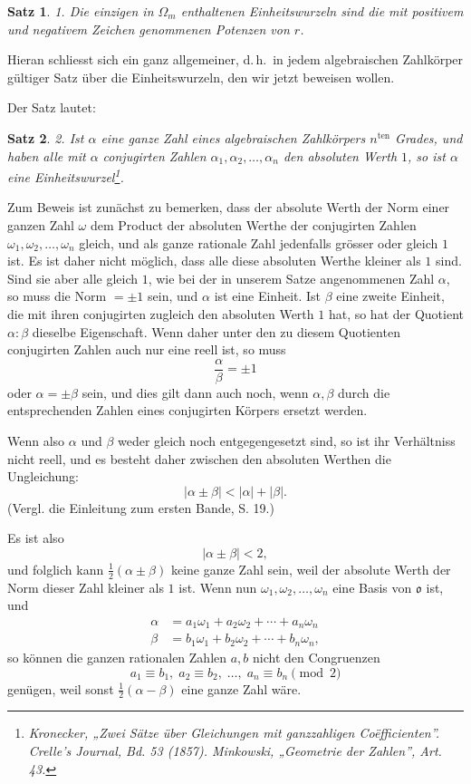 \documentclass[12pt,a4paper]{article}
\newtheorem*{satz}{Satz}
\begin{document}
\begin{satz}
1. Die einzigen in $\Omega_m$ enthaltenen Einheitswurzeln sind die mit positivem und negativem Zeichen genommenen Potenzen von $r$.
\end{satz}

Hieran schliesst sich ein ganz allgemeiner, d.\,h.\ in jedem algebraischen Zahlkörper gültiger Satz über die Einheitswurzeln, den wir jetzt beweisen wollen.

Der Satz lautet:

\begin{satz}
2. Ist $\alpha$ eine ganze Zahl eines algebraischen Zahlkörpers $n^{\text{ten}}$ Grades, und haben alle mit $\alpha$ conjugirten Zahlen $\alpha_1, \alpha_2, \ldots, \alpha_n$ den absoluten Werth $1$, so ist $\alpha$ eine Einheitswurzel\footnote{Kronecker, „Zwei Sätze über Gleichungen mit ganzzahligen Coëfficienten''. Crelle's Journal, Bd. 53 (1857). Minkowski, „Geometrie der Zahlen'', Art. 43.}.
\end{satz}

Zum Beweis ist zunächst zu bemerken, dass der absolute Werth der Norm einer ganzen Zahl $\omega$ dem Product der absoluten Werthe der conjugirten Zahlen $\omega_1, \omega_2, \ldots, \omega_n$ gleich, und als ganze rationale Zahl jedenfalls grösser oder gleich $1$ ist. Es ist daher nicht möglich, dass alle diese absoluten Werthe kleiner als $1$ sind. Sind sie aber alle gleich $1$, wie bei der in unserem Satze angenommenen Zahl $\alpha$, so muss die Norm $= \pm 1$ sein, und $\alpha$ ist eine Einheit. Ist $\beta$ eine zweite Einheit, die mit ihren conjugirten zugleich den absoluten Werth $1$ hat, so hat der Quotient $\alpha : \beta$ dieselbe Eigenschaft. Wenn daher unter den zu diesem Quotienten conjugirten Zahlen auch nur eine reell ist, so muss
\[
\frac{\alpha}{\beta} = \pm 1
\]
oder $\alpha = \pm\beta$ sein, und dies gilt dann auch noch, wenn $\alpha, \beta$ durch die entsprechenden Zahlen eines conjugirten Körpers ersetzt werden.

Wenn also $\alpha$ und $\beta$ weder gleich noch entgegengesetzt sind, so ist ihr Verhältniss nicht reell, und es besteht daher zwischen den absoluten Werthen die Ungleichung:
\[
|\alpha \pm \beta| < |\alpha| + |\beta|.
\]
(Vergl. die Einleitung zum ersten Bande, S. 19.)

Es ist also
\[
|\alpha \pm \beta| < 2,
\]
und folglich kann $\frac{1}{2}(\alpha \pm \beta)$ keine ganze Zahl sein, weil der absolute Werth der Norm dieser Zahl kleiner als $1$ ist. Wenn nun $\omega_1, \omega_2, \ldots, \omega_n$ eine Basis von $\mathfrak{o}$ ist, und
\begin{align*}
\alpha &= a_1\omega_1 + a_2\omega_2 + \cdots + a_n\omega_n\\
\beta &= b_1\omega_1 + b_2\omega_2 + \cdots + b_n\omega_n,
\end{align*}
so können die ganzen rationalen Zahlen $a, b$ nicht den Congruenzen
\[
a_1 \equiv b_1,\; a_2 \equiv b_2,\; \ldots,\; a_n \equiv b_n \pmod{2}
\]
genügen, weil sonst $\frac{1}{2}(\alpha - \beta)$ eine ganze Zahl wäre.
\end{document}
